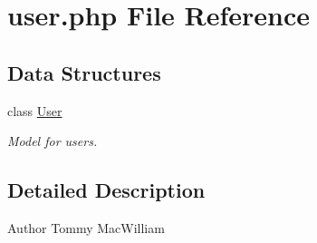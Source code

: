 \hypertarget{user_8php}{
\section{user.php File Reference}
\label{user_8php}
}
\subsection*{Data Structures}
\begin{DoxyCompactItemize}
\item 
class \hyperlink{class_user}{User}
\begin{DoxyCompactList}\small\item\em Model for users. \item\end{DoxyCompactList}\end{DoxyCompactItemize}


\subsection{Detailed Description}
\begin{DoxyAuthor}{Author}
Tommy MacWilliam 
\end{DoxyAuthor}
